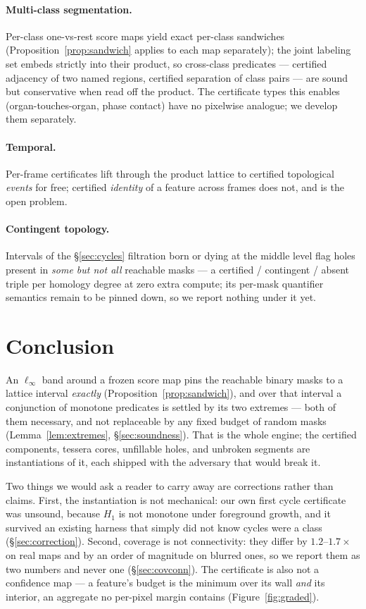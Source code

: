 \documentclass[10pt]{article}
\begin{document}
\paragraph{Multi-class segmentation.} Per-class one-vs-rest score maps
yield exact per-class sandwiches (Proposition~\ref{prop:sandwich} applies
to each map separately); the joint labeling set embeds strictly into
their product, so cross-class predicates --- certified adjacency of two
named regions, certified separation of class pairs --- are sound but
conservative when read off the product. The certificate types this
enables (organ-touches-organ, phase contact) have no pixelwise analogue;
we develop them separately.

\paragraph{Temporal.} Per-frame certificates lift through the product
lattice to certified topological \emph{events} for free; certified
\emph{identity} of a feature across frames does not, and is the open
problem.

\paragraph{Contingent topology.} Intervals of the \S\ref{sec:cycles}
filtration born or dying at the middle level flag holes present in
\emph{some but not all} reachable masks --- a certified / contingent /
absent triple per homology degree at zero extra compute; its per-mask
quantifier semantics remain to be pinned down, so we report nothing under
it yet.

\section{Conclusion}\label{sec:conclusion}

An $\ell_\infty$ band around a frozen score map pins the reachable binary
masks to a lattice interval \emph{exactly} (Proposition~\ref{prop:sandwich}),
and over that interval a conjunction of monotone predicates is settled by
its two extremes --- both of them necessary, and not replaceable by any
fixed budget of random masks (Lemma~\ref{lem:extremes},
\S\ref{sec:soundness}). That is the whole engine; the certified components,
tessera cores, unfillable holes, and unbroken segments are instantiations
of it, each shipped with the adversary that would break it.

Two things we would ask a reader to carry away are corrections rather than
claims. First, the instantiation is not mechanical: our own first cycle
certificate was unsound, because $H_1$ is not monotone under foreground
growth, and it survived an existing harness that simply did not know cycles
were a class (\S\ref{sec:correction}). Second, coverage is not
connectivity: they differ by $1.2$--$1.7\times$ on real maps and by an
order of magnitude on blurred ones, so we report them as two numbers and
never one (\S\ref{sec:covconn}). The certificate is also not a confidence
map --- a feature's budget is the minimum over its wall \emph{and} its
interior, an aggregate no per-pixel margin contains
(Figure~\ref{fig:graded}).
\end{document}
